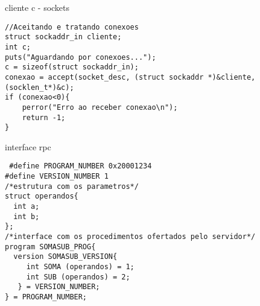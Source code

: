 
\begin{chunk}{cliente c - sockets}
\ansic
\begin{lstlisting}
//Aceitando e tratando conexoes
struct sockaddr_in cliente;
int c;
puts("Aguardando por conexoes...");
c = sizeof(struct sockaddr_in);
conexao = accept(socket_desc, (struct sockaddr *)&cliente, (socklen_t*)&c);
if (conexao<0){
	perror("Erro ao receber conexao\n");
	return -1;
}
\end{lstlisting}
\end{chunk}

\begin{chunk}{interface rpc}
\ansic 
\begin{lstlisting}
 #define PROGRAM_NUMBER 0x20001234
#define VERSION_NUMBER 1
/*estrutura com os parametros*/
struct operandos{
  int a;
  int b;
};
/*interface com os procedimentos ofertados pelo servidor*/
program SOMASUB_PROG{
  version SOMASUB_VERSION{
     int SOMA (operandos) = 1;
     int SUB (operandos) = 2;
   } = VERSION_NUMBER;
} = PROGRAM_NUMBER;
\end{lstlisting}

\end{chunk}



